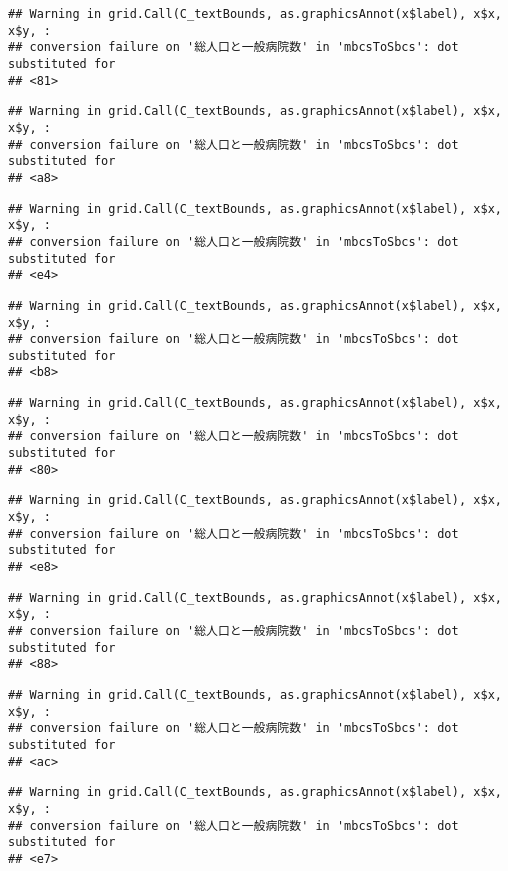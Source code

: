 \documentclass[
]{article}
\begin{document}
\begin{verbatim}
## Warning in grid.Call(C_textBounds, as.graphicsAnnot(x$label), x$x, x$y, :
## conversion failure on '総人口と一般病院数' in 'mbcsToSbcs': dot substituted for
## <81>
\end{verbatim}

\begin{verbatim}
## Warning in grid.Call(C_textBounds, as.graphicsAnnot(x$label), x$x, x$y, :
## conversion failure on '総人口と一般病院数' in 'mbcsToSbcs': dot substituted for
## <a8>
\end{verbatim}

\begin{verbatim}
## Warning in grid.Call(C_textBounds, as.graphicsAnnot(x$label), x$x, x$y, :
## conversion failure on '総人口と一般病院数' in 'mbcsToSbcs': dot substituted for
## <e4>
\end{verbatim}

\begin{verbatim}
## Warning in grid.Call(C_textBounds, as.graphicsAnnot(x$label), x$x, x$y, :
## conversion failure on '総人口と一般病院数' in 'mbcsToSbcs': dot substituted for
## <b8>
\end{verbatim}

\begin{verbatim}
## Warning in grid.Call(C_textBounds, as.graphicsAnnot(x$label), x$x, x$y, :
## conversion failure on '総人口と一般病院数' in 'mbcsToSbcs': dot substituted for
## <80>
\end{verbatim}

\begin{verbatim}
## Warning in grid.Call(C_textBounds, as.graphicsAnnot(x$label), x$x, x$y, :
## conversion failure on '総人口と一般病院数' in 'mbcsToSbcs': dot substituted for
## <e8>
\end{verbatim}

\begin{verbatim}
## Warning in grid.Call(C_textBounds, as.graphicsAnnot(x$label), x$x, x$y, :
## conversion failure on '総人口と一般病院数' in 'mbcsToSbcs': dot substituted for
## <88>
\end{verbatim}

\begin{verbatim}
## Warning in grid.Call(C_textBounds, as.graphicsAnnot(x$label), x$x, x$y, :
## conversion failure on '総人口と一般病院数' in 'mbcsToSbcs': dot substituted for
## <ac>
\end{verbatim}

\begin{verbatim}
## Warning in grid.Call(C_textBounds, as.graphicsAnnot(x$label), x$x, x$y, :
## conversion failure on '総人口と一般病院数' in 'mbcsToSbcs': dot substituted for
## <e7>
\end{verbatim}
\end{document}
